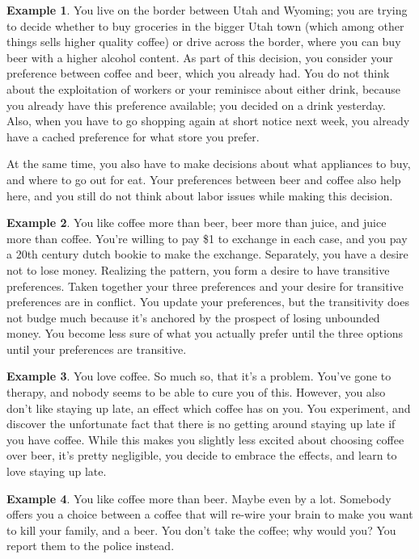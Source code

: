 \documentclass{article}
\theoremstyle{plain}
\theoremstyle{definition}
\newtheorem{example}{Example}[section]
\theoremstyle{remark}
\begin{document}
	\begin{example}
		You live on the border between Utah and Wyoming; you are trying to decide whether to buy groceries in the bigger Utah town (which among other things sells higher quality coffee) or drive across the border, where you can buy beer with a higher alcohol content. As part of this decision, you consider your preference between coffee and beer, which you already had. You do not think about the exploitation of workers or your reminisce about either drink, because you already have this preference available; you decided on a drink yesterday. Also, when you have to go shopping again at short notice next week, you already have a cached preference for what store you prefer. 
		
		At the same time, you also have to make decisions about what appliances to buy, and where to go out for eat. Your preferences between beer and coffee also help here, and you still do not think about labor issues while making this decision.
	\end{example}

	\begin{example}
		You like coffee more than beer, beer more than juice, and juice more than coffee. You're willing to pay \$1 to exchange in each case, and you pay a 20th century dutch bookie to make the exchange. Separately, you have a desire not to lose money. Realizing the pattern, you form a desire to have transitive preferences. Taken together your three preferences and your desire for transitive preferences are in conflict. You update your preferences, but the transitivity does not budge much because it's anchored by the prospect of losing unbounded money. You become less sure of what you actually prefer until the three options until your preferences are transitive.
	\end{example}

	\begin{example}
		You love coffee. So much so, that it's a problem. You've gone to therapy, and nobody seems to be able to cure you of this. However, you also don't like staying up late, an effect which coffee has on you. You experiment, and discover the unfortunate fact that there is no getting around staying up late if you have coffee. While this makes you slightly less excited about choosing coffee over beer, it's pretty negligible, you decide to embrace the effects, and learn to love staying up late.
	\end{example}

	\begin{example}
		You like coffee more than beer. Maybe even by a lot. Somebody offers you a choice between a coffee that will re-wire your brain to make you want to kill your family, and a beer. You don't take the coffee; why would you? You report them to the police instead.
	\end{example}
\end{document}
